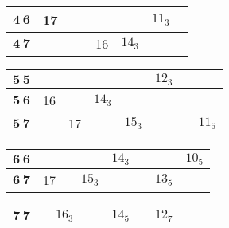 \documentclass[a4paper,12pt]{report}
\begin{document}
\begin{center}
\begin{tabular}{|c||c|c|c|c|c|c|c|}
$\textbf{4}\:\textbf{6}$ &17  &  & & \hspace{6mm} & &$11_{3}$ & \hspace{6mm} \\ \hline

$\textbf{4}\:\textbf{7}$ &  &  & &16 & $14_{3}$& & \\ \hline
\end{tabular}

\begin{tabular}{|c||c|c|c|c|c|c|c|}\hline
\hspace{1.5mm} $\textbf{5}\:\textbf{5}$ \hspace{1mm} & \hspace{6mm} & \hspace{6mm} & \hspace{6mm} & \hspace{6mm} &
$12_{3}$& \hspace{6mm} & \hspace{6mm}
\\ \hline

$\textbf{5}\:\textbf{6}$ & 16 & & $14_{3}$&   & \hspace{6mm} & & \\ \hline

$\textbf{5}\:\textbf{7}$ &  &17  & & $15_{3}$ & & & $11_{5}$ \\ \hline
\end{tabular}

\begin{tabular}{|c||c|c|c|c|c|c|c|}\hline
\hspace{1.5mm} $\textbf{6}\:\textbf{6}$ \hspace{1mm} & \hspace{6mm} & \hspace{6mm} & \hspace{6mm} & $14_{3}$& \hspace{6mm} & \hspace{6mm} &$10_{5}$\\
\hline

$\textbf{6}\:\textbf{7}$ & 17 &  & $15_{3}$& \hspace{6mm} & & $13_{5}$& \hspace{6mm}  \\ \hline
\end{tabular}

\begin{tabular}{|c||c|c|c|c|c|c|c|}\hline
\hspace{1.5mm} $\textbf{7}\:\textbf{7}$ \hspace{1mm} & \hspace{6mm} &\hspace{0.1mm}$16_{3}$ &\hspace{6mm} &
\hspace{6mm} &$14_{5}$ & \hspace{6mm} &$12_{7}$\\ \hline
\end{tabular}

\end{center}
\end{document}
